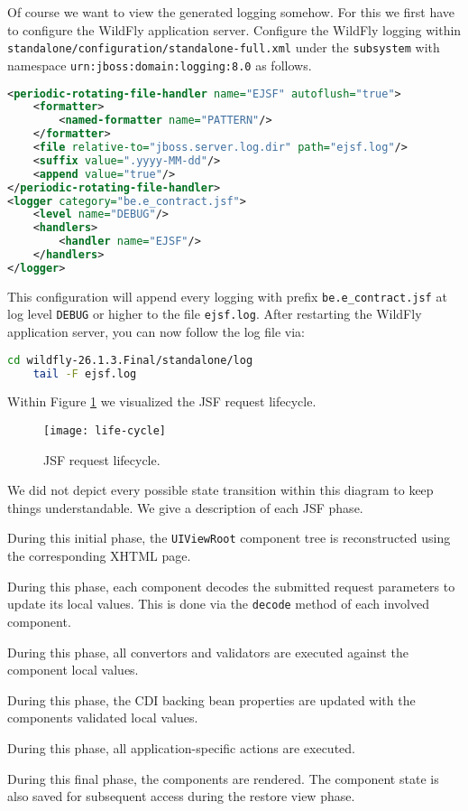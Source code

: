 Of course we want to view the generated logging somehow.
For this we first have to configure the WildFly application server.
Configure the WildFly logging within \texttt{standalone/configuration/standalone-full.xml} under the \texttt{subsystem} with namespace \texttt{urn:jboss:domain:logging:8.0} as follows.
\begin{lstlisting}[language=XML]
<periodic-rotating-file-handler name="EJSF" autoflush="true">
	<formatter>
		<named-formatter name="PATTERN"/>
	</formatter>
	<file relative-to="jboss.server.log.dir" path="ejsf.log"/>
	<suffix value=".yyyy-MM-dd"/>
	<append value="true"/>
</periodic-rotating-file-handler>
<logger category="be.e_contract.jsf">
	<level name="DEBUG"/>
	<handlers>
		<handler name="EJSF"/>
	</handlers>
</logger>
\end{lstlisting}
This configuration will append every logging with prefix \texttt{be.e\_contract.jsf} at log level \texttt{DEBUG} or higher to the file \texttt{ejsf.log}.
After restarting the WildFly application server, you can now follow the log file via:
\begin{lstlisting}[language=bash]
	cd wildfly-26.1.3.Final/standalone/log
	tail -F ejsf.log
\end{lstlisting}
Within Figure \ref{fig:life-cycle} we visualized the JSF request lifecycle.
\begin{figure}[htbp]
	\begin{center}
		\texttt{[image: life-cycle]}
		\caption{JSF request lifecycle.}
		\label{fig:life-cycle}
	\end{center}
\end{figure}
We did not depict every possible state transition within this diagram to keep things understandable.
We give a description of each JSF phase.
\begin{description}[style=nextline]
	\item[Restore View]
	During this initial phase, the \texttt{UIViewRoot} component tree is reconstructed using the corresponding XHTML page.
	\item[Apply Request Values]
	During this phase, each component decodes the submitted request parameters to update its local values.
	This is done via the \texttt{decode} method of each involved component.
	\item[Process Validations]
	During this phase, all convertors and validators are executed against the component local values.
	\item[Update Model Values]
	During this phase, the CDI backing bean properties are updated with the components validated local values.
	\item[Invoke Application]
	During this phase, all application-specific actions are executed.
	\item[Render Response]
	During this final phase, the components are rendered.
	The component state is also saved for subsequent access during the restore view phase.
\end{description}
